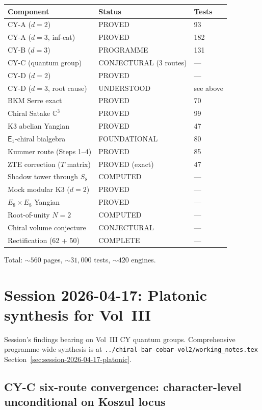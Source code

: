\documentclass[11pt]{article}
\newcommand{\C}{\mathbb{C}}
\newcommand{\Eone}{\mathsf{E}_1}
\begin{document}
\begin{center}
\renewcommand{\arraystretch}{1.3}
\begin{tabular}{lll}
 \toprule
 \textbf{Component} & \textbf{Status} & \textbf{Tests} \\
 \midrule
 CY-A ($d = 2$) & PROVED & 93 \\
 CY-A ($d = 3$, inf-cat) & PROVED & 182 \\
 CY-B ($d = 3$) & PROGRAMME & 131 \\
 CY-C (quantum group) & CONJECTURAL (3 routes) & --- \\
 CY-D ($d = 2$) & PROVED & --- \\
 CY-D ($d = 3$, root cause) & UNDERSTOOD & see above \\
 BKM Serre exact & PROVED & 70 \\
 Chiral Satake $\C^3$ & PROVED & 99 \\
 K3 abelian Yangian & PROVED & 47 \\
 $\Eone$-chiral bialgebra & FOUNDATIONAL & 80 \\
 Kummer route (Steps 1--4) & PROVED & 85 \\
 ZTE correction ($T$ matrix) & PROVED (exact) & 47 \\
 Shadow tower through $S_8$ & COMPUTED & --- \\
 Mock modular K3 ($d = 2$) & PROVED & --- \\
 $E_8 \times E_8$ Yangian & PROVED & --- \\
 Root-of-unity $N = 2$ & COMPUTED & --- \\
 Chiral volume conjecture & CONJECTURAL & --- \\
 Rectification (62 + 50) & COMPLETE & --- \\
 \bottomrule
\end{tabular}
\end{center}

Total: ${\sim}560$ pages, ${\sim}31{,}000$ tests, ${\sim}420$ engines.

\section{Session 2026-04-17: Platonic synthesis for Vol~III}
\label{sec:vol3-session-2026-04-17}

Session's findings bearing on Vol~III CY quantum groups. Comprehensive
programme-wide synthesis is at
\texttt{../chiral-bar-cobar-vol2/working\_notes.tex}
Section~\ref*{sec:session-2026-04-17-platonic}.

\subsection{CY-C six-route convergence: character-level unconditional
on Koszul locus}
\end{document}
